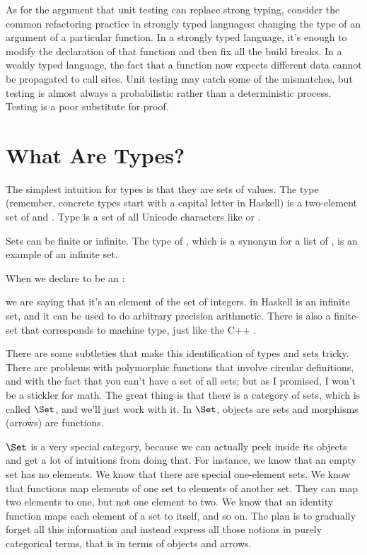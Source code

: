 As for the argument that unit testing can replace strong typing,
consider the common refactoring practice in strongly typed languages:
changing the type of an argument of a particular function. In a strongly
typed language, it's enough to modify the declaration of that function
and then fix all the build breaks. In a weakly typed language, the fact
that a function now expects different data cannot be propagated to call
sites. Unit testing may catch some of the mismatches, but testing is
almost always a probabilistic rather than a deterministic process.
Testing is a poor substitute for proof.

\section{What Are Types?}

The simplest intuition for types is that they are sets of values. The
type  (remember, concrete types start with a capital letter
in Haskell) is a two-element set of  and .
Type  is a set of all Unicode characters like
 or .

Sets can be finite or infinite. The type of , which is a
synonym for a list of , is an example of an infinite set.

When we declare  to be an :

we are saying that it's an element of the set of integers.
 in Haskell is an infinite set, and it can be used to do
arbitrary precision arithmetic. There is also a finite-set 
that corresponds to machine type, just like the C++ .

There are some subtleties that make this identification of types and
sets tricky. There are problems with polymorphic functions that involve
circular definitions, and with the fact that you can't have a set of all
sets; but as I promised, I won't be a stickler for math. The great thing
is that there is a category of sets, which is called $\Set$, and
we'll just work with it. In $\Set$, objects are sets and morphisms
(arrows) are functions.

$\Set$ is a very special category, because we can actually peek
inside its objects and get a lot of intuitions from doing that. For
instance, we know that an empty set has no elements. We know that there
are special one-element sets. We know that functions map elements of one
set to elements of another set. They can map two elements to one, but
not one element to two. We know that an identity function maps each
element of a set to itself, and so on. The plan is to gradually forget
all this information and instead express all those notions in purely
categorical terms, that is in terms of objects and arrows.

